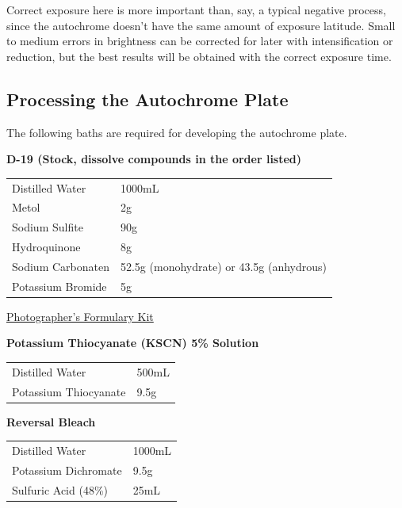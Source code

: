 \documentclass[11pt]{article}
\begin{document}
Correct exposure here is more important than, say, a typical negative process, since the autochrome doesn't have the same amount of exposure latitude. Small to medium errors in brightness can be corrected for later with intensification or reduction, but the best results will be obtained with the correct exposure time.\newline

\subsection{Processing the Autochrome Plate}

The following baths are required for developing the autochrome plate.\newline

\textbf{D-19 (Stock, dissolve compounds in the order listed)}\newline

\begin{tabular}{ll}
	Distilled Water & 1000mL \\
	Metol & 2g \\
	Sodium Sulfite & 90g \\
	Hydroquinone & 8g \\
	Sodium Carbonaten & 52.5g (monohydrate) or 43.5g (anhydrous)\\
	Potassium Bromide & 5g
\end{tabular}\newline

\href{http://stores.photoformulary.com/formulary-substitute-d-19/}{Photographer's Formulary Kit}\newline

\textbf{Potassium Thiocyanate (KSCN) 5\% Solution}\newline

\begin{tabular}{ll}
	Distilled Water & 500mL \\
	Potassium Thiocyanate & 9.5g \\
\end{tabular}\newline

\textbf{Reversal Bleach}\newline

\begin{tabular}{ll}
	Distilled Water & 1000mL \\
	Potassium Dichromate & 9.5g \\
	Sulfuric Acid (48\%) & 25mL \\
\end{tabular}\newline
\end{document}
